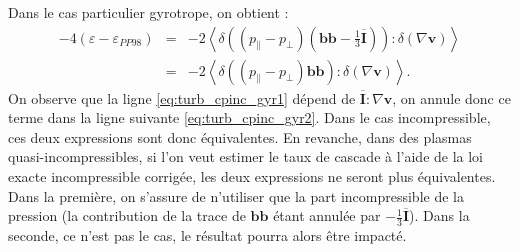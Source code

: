 Dans le cas particulier gyrotrope, on obtient :
\begin{eqnarray}
\label{eq:turb_cpinc_gyr1} 
- 4(\varepsilon - \varepsilon_{PP98}) &=& -2 \left< \delta ((p_{\parallel} - p_{\perp})(\boldsymbol{b}\boldsymbol{b} -\frac{1}{3} \overline{\boldsymbol{I}})):\delta (\nabla \boldsymbol{v}) \right> \\
\label{eq:turb_cpinc_gyr2} &=& -2 \left< \delta ((p_{\parallel} - p_{\perp})\boldsymbol{b}\boldsymbol{b}):\delta (\nabla \boldsymbol{v}) \right> .
\end{eqnarray}
 On observe que la ligne \eqref{eq:turb_cpinc_gyr1} dépend de $\overline{\boldsymbol{I}} :\nabla \boldsymbol{v}$, on annule donc ce terme dans la ligne suivante \eqref{eq:turb_cpinc_gyr2}. Dans le cas incompressible, ces deux expressions sont donc équivalentes. En revanche, dans des plasmas quasi-incompressibles, si l'on veut estimer le taux de cascade à l'aide de la loi exacte incompressible corrigée, les deux expressions ne seront plus équivalentes. Dans la première, on s'assure de n'utiliser que la part incompressible de la pression (la contribution de la trace de $\boldsymbol{b}\boldsymbol{b}$ étant annulée par $-\frac{1}{3} \overline{\boldsymbol{I}}$). Dans la seconde, ce n'est pas le cas, le résultat pourra alors être impacté.
 
